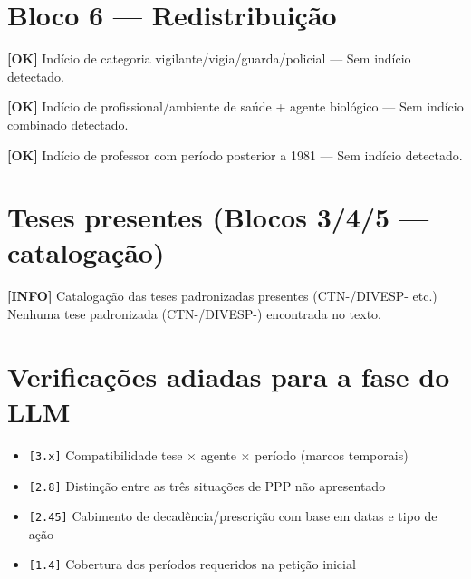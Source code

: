 \documentclass[12pt,a4paper]{article}
\newcommand{\statusOK}[1]{\textcolor{corOK}{\textbf{[OK]}} #1}
\newcommand{\statusINFO}[1]{\textcolor{corINFO}{\textbf{[INFO]}} #1}
\begin{document}
\section{Bloco 6 --- Redistribuição}

\statusOK{Indício de categoria vigilante/vigia/guarda/policial} --- Sem indício detectado.

\medskip
\statusOK{Indício de profissional/ambiente de saúde + agente biológico} --- Sem indício combinado detectado.

\medskip
\statusOK{Indício de professor com período posterior a 1981} --- Sem indício detectado.

\section{Teses presentes (Blocos 3/4/5 --- catalogação)}

\statusINFO{Catalogação das teses padronizadas presentes (CTN-/DIVESP- etc.)}\\
Nenhuma tese padronizada (CTN-/DIVESP-) encontrada no texto.

\section{Verificações adiadas para a fase do LLM}

\begin{itemize}
  \item \texttt{[3.x]} Compatibilidade tese × agente × período (marcos temporais)
  \item \texttt{[2.8]} Distinção entre as três situações de PPP não apresentado
  \item \texttt{[2.45]} Cabimento de decadência/prescrição com base em datas e tipo de ação
  \item \texttt{[1.4]} Cobertura dos períodos requeridos na petição inicial
\end{itemize}
\end{document}
